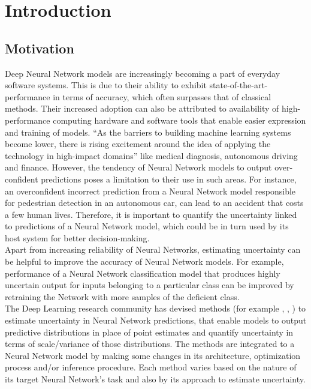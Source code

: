 

    \chapter{Introduction}
    \section{Motivation}
	Deep Neural Network models are increasingly becoming a part of everyday software systems. This is due to their ability to exhibit state-of-the-art-performance in terms of accuracy, which often surpasses that of classical methods. Their increased adoption can also be attributed to availability of high-performance computing hardware and software tools that enable easier expression and training of models. \enquote{As the barriers to building machine learning systems become lower, there is rising excitement around the idea of applying the technology in high-impact domains} \cite{schulam2019can}like medical diagnosis, autonomous driving and finance. However, the tendency of Neural Network models to output over-confident predictions\cite{lakshminarayanan2017simple} poses a limitation to their use in such areas. For instance, an overconfident incorrect prediction from a Neural Network model responsible for pedestrian detection in an autonomous car, can lead to an accident that costs a few human lives. Therefore, it is important to quantify the uncertainty linked  to predictions of a Neural Network model, which could be in turn used by its host system for better decision-making.
	\\
	Apart from increasing reliability of Neural Networks, estimating uncertainty can be helpful to improve the accuracy of Neural Network models. For example, performance of a Neural Network classification model that produces highly uncertain output for inputs belonging to a particular class can be improved by retraining the Network with more samples of the deficient class.\cite{settles2012active}\cite{yang2016active}
	\\
	The Deep Learning research community has devised methods (for example \cite{amini2020deep}, \cite{gal2016dropout}, \cite{lakshminarayanan2017simple}) to estimate uncertainty in Neural Network predictions, that enable models to output predictive distributions in place of point estimates and quantify uncertainty in terms of scale/variance of those distributions. The methods are integrated to a Neural Network model by making some changes in its architecture, optimization process and/or inference procedure. Each method varies based on the nature of its target Neural Network's task and also by its approach to estimate uncertainty.
